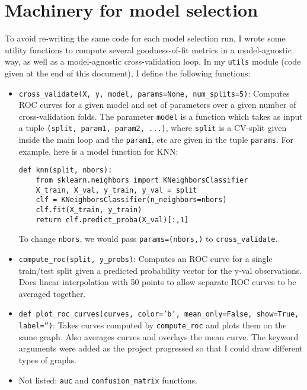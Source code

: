 \documentclass[11pt]{article}
\begin{document}
    \section{Machinery for model selection}
    To avoid re-writing the same code for each model selection run, I wrote some utility functions to compute several goodness-of-fit metrics in a model-agnostic way, as well as a model-agnostic cross-validation loop. In my \texttt{utils} module (code given at the end of this document), I define the following functions:
    \begin{itemize}
    \item \texttt{cross\_validate(X, y, model, params=None, num\_splits=5)}: Computes ROC curves for a given model and set of parameters over a given number of cross-validation folds. The parameter \texttt{model} is a function which takes as input a tuple \texttt{(split, param1, param2, ...)}, where \texttt{split} is a CV-split given inside the main loop and the \texttt{param1}, etc are given in the tuple \texttt{params}. For example, here is a model function for KNN:
\begin{verbatim}
def knn(split, nbors):
    from sklearn.neighbors import KNeighborsClassifier
    X_train, X_val, y_train, y_val = split
    clf = KNeighborsClassifier(n_neighbors=nbors)
    clf.fit(X_train, y_train)
    return clf.predict_proba(X_val)[:,1]
\end{verbatim}
      To change \texttt{nbors}, we would pass \texttt{params=(nbors,)} to \texttt{cross\_validate}.
    \item \texttt{compute\_roc(split, y\_probs)}: Computes an ROC curve for a single train/test split given a predicted probability vector for the y-val observations. Does linear interpolation with 50 points to allow separate ROC curves to be averaged together.
    \item \texttt{def plot\_roc\_curves(curves, color='b', mean\_only=False, show=True, label='')}: Takes curves computed by \texttt{compute\_roc} and plots them on the same graph. Also averages curves and overlays the mean curve. The keyword arguments were added as the project progressed so that I could draw different types of graphs.

      \item Not listed: \texttt{auc} and \texttt{confusion\_matrix} functions.
    \end{itemize}
\end{document}
